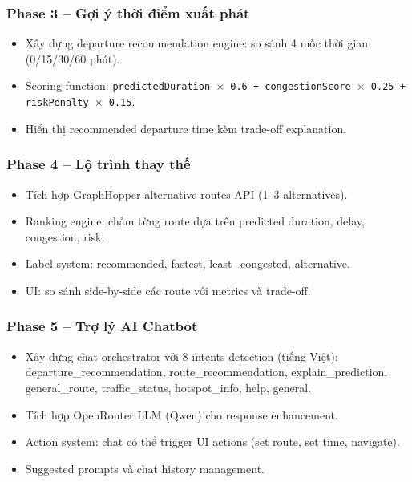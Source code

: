 \documentclass[12pt,a4paper]{article}
\begin{document}
\subsubsection{Phase 3 -- Gợi ý thời điểm xuất phát}
\begin{itemize}[leftmargin=1.2cm]
    \item Xây dựng departure recommendation engine: so sánh 4 mốc thời gian (0/15/30/60 phút).
    \item Scoring function: \texttt{predictedDuration $\times$ 0.6 + congestionScore $\times$ 0.25 + riskPenalty $\times$ 0.15}.
    \item Hiển thị recommended departure time kèm trade-off explanation.
\end{itemize}

\subsubsection{Phase 4 -- Lộ trình thay thế}
\begin{itemize}[leftmargin=1.2cm]
    \item Tích hợp GraphHopper alternative routes API (1--3 alternatives).
    \item Ranking engine: chấm từng route dựa trên predicted duration, delay, congestion, risk.
    \item Label system: recommended, fastest, least\_congested, alternative.
    \item UI: so sánh side-by-side các route với metrics và trade-off.
\end{itemize}

\subsubsection{Phase 5 -- Trợ lý AI Chatbot}
\begin{itemize}[leftmargin=1.2cm]
    \item Xây dựng chat orchestrator với 8 intents detection (tiếng Việt): departure\_recommendation, route\_recommendation, explain\_prediction, general\_route, traffic\_status, hotspot\_info, help, general.
    \item Tích hợp OpenRouter LLM (Qwen) cho response enhancement.
    \item Action system: chat có thể trigger UI actions (set route, set time, navigate).
    \item Suggested prompts và chat history management.
\end{itemize}
\end{document}
